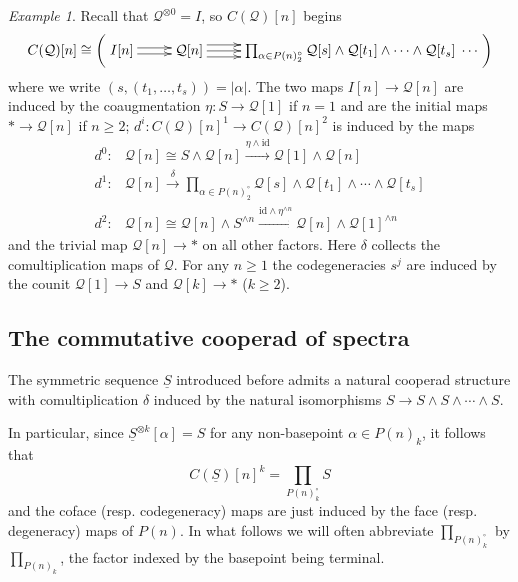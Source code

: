 \documentclass[12pt]{amsart}
\theoremstyle{definition}
\theoremstyle{remark}
\newtheorem{example}[subsection]{Example}
\newcommand{\id}{\mathrm{id}}
\newcommand{\pt}{*}
\newcommand{\Cal}[1]{\mathcal{#1}}
\newcommand{\uS}{\underline{S}}
\begin{document}
\begin{example} \label{coop-ex}
Recall that $\Cal{Q}^{\otimes 0}=I$, so $C(\Cal{Q})[n]$ begins \begin{equation}
        C(\Cal{Q})[n]\cong \left( \xymatrix{
            I[n] \ar@<.5ex>[r] \ar@<-.5ex>[r] &
            \Cal{Q}[n] \ar@<1ex>[r] \ar[r] \ar@<-1ex>[r] &
            \prod_{\alpha\in P(n)_2^{\circ}}  \Cal{Q}[s]\wedge \Cal{Q}[t_1]\wedge\cdots\wedge \Cal{Q}[t_{s}] \; \cdots
        }\right)
    \end{equation}
    where we write $(s,(t_1,\dots,t_s))=|\alpha|$. The two maps $I[n]\to \Cal{Q}[n]$ are induced by the coaugmentation $\eta\colon S\to \Cal{Q}[1]$ if $n=1$ and are the initial maps $\pt\to \Cal{Q}[n]$ if $n\geq 2$; $d^i\colon C(\Cal{Q})[n]^1\to C(\Cal{Q})[n]^2$ is induced by the maps \begin{align*}
        d^0 \colon & \Cal{Q}[n]\cong S\wedge \Cal{Q}[n] \xrightarrow{\eta\wedge \id} \Cal{Q}[1]\wedge \Cal{Q}[n]
        \\
        d^1 \colon & \Cal{Q}[n] \xrightarrow{\delta} \prod_{\alpha\in P(n)^{\circ}_2} \Cal{Q}[s] \wedge \Cal{Q}[t_1]\wedge\cdots \wedge \Cal{Q}[t_s]
        \\
        d^2 \colon & \Cal{Q}[n]\cong \Cal{Q}[n] \wedge S^{\wedge n} \xrightarrow{\id\wedge \eta^{\wedge n}} \Cal{Q}[n] \wedge \Cal{Q}[1]^{\wedge n}
    \end{align*}
    and the trivial map $\Cal{Q}[n]\to \pt$ on all other factors. Here $\delta$ collects the comultiplication maps of $\Cal{Q}$. For any $n\geq 1$ the codegeneracies $s^j$ are induced by the counit $\Cal{Q}[1]\to S$ and $\Cal{Q}[k]\to \pt$ ($k\geq 2$).
\end{example}




\subsection{The commutative cooperad of spectra} \label{com-coop}
The symmetric sequence $\uS$ introduced before admits a natural cooperad structure with comultiplication $\delta$ induced by the natural isomorphisms $S\to S\wedge S\wedge \cdots \wedge S$.

In particular, since $\uS^{\otimes k}[\alpha]=S$ for any non-basepoint $\alpha\in P(n)_k$, it follows that 
\[ C(\uS)[n]^k= {\prod}_{P(n)^{\circ}_{k}} S\]
and the coface (resp. codegeneracy) maps are just induced by the face (resp. degeneracy) maps of $P(n)$. In what follows we will often abbreviate $\prod_{P(n)^{\circ}_k}$ by $\prod_{P(n)_k}$, the factor indexed by the basepoint being terminal.
\end{document}
